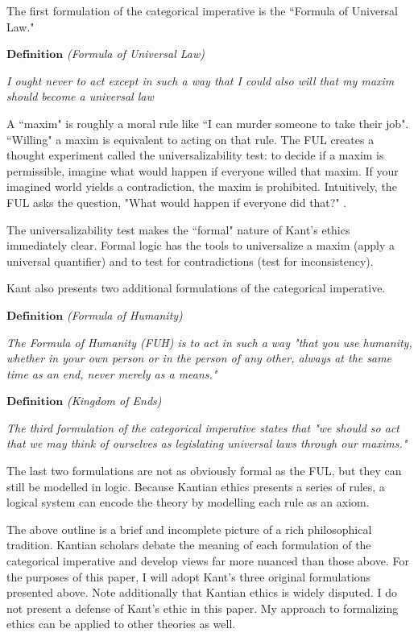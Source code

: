 \begin{isabellebody}
\begin{isamarkuptext}
The first formulation of the categorical imperative is the ``Formula of Universal Law." 

$\textbf{Definition}$ \emph{(Formula of Universal Law)}

\emph{I ought never to act except in such a way that I could also will that my maxim should become a universal law} \cite{groundwork}

A ``maxim" is roughly a moral rule like ``I can murder someone to take their job". ``Willing" a maxim is 
equivalent to acting on that rule. The FUL creates a thought experiment called the universalizability 
test: to decide if a maxim is permissible, imagine what would happen if everyone willed that maxim. 
If your imagined world yields a contradiction, the maxim is prohibited. Intuitively, the FUL asks 
the question, "What would happen if everyone did that?" \cite{KorsgaardFUL}.

The universalizability test makes the ``formal" nature of Kant's ethics immediately clear. Formal 
logic has the tools to universalize a maxim (apply a universal quantifier) and to test for 
contradictions (test for inconsistency). 

Kant also presents two additional formulations of the categorical imperative. 

$\textbf{Definition}$ \emph{(Formula of Humanity)}

\emph{The Formula of Humanity (FUH)
is to act in such a way "that you use humanity, whether in your own person or in the person
of any other, always at the same time as an end, never merely as a means."}\cite{groundwork}

\medskip 

$\textbf{Definition}$ \emph{(Kingdom of Ends)}

\emph{The third formulation of the categorical imperative states that "we should so act that we may 
think of ourselves as legislating universal laws through our maxims."}\cite{KorsgaardFUL}

The last two formulations are not as obviously formal as the FUL, but they can still be
modelled in logic. Because Kantian ethics presents a series of rules, a logical system can encode 
the theory by modelling each rule as an axiom.

The above outline is a brief and incomplete picture of a rich philosophical tradition. Kantian scholars
debate the meaning of each formulation of the categorical imperative and develop views far more 
nuanced than those above. For the purposes of this paper, I will adopt Kant's three original 
formulations presented above. Note additionally that Kantian ethics is widely disputed. I do not present 
a defense of Kant's ethic in this paper. My approach to formalizing ethics can be applied to other 
theories as well.  


\end{isamarkuptext}
\end{isabellebody}

